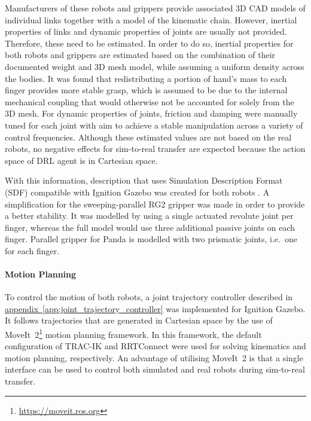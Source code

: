 Manufacturers of these robots and grippers provide associated 3D CAD models of individual links together with a model of the kinematic chain. However, inertial properties of links and dynamic properties of joints are usually not provided. Therefore, these need to be estimated. In order to do so, inertial properties for both robots and grippers are estimated based on the combination of their documented weight and 3D mesh model, while assuming a uniform density across the bodies. It was found that redistributing a portion of hand's mass to each finger provides more stable grasp, which is assumed to be due to the internal mechanical coupling that would otherwise not be accounted for solely from the 3D mesh. For dynamic properties of joints, friction and damping were manually tuned for each joint with aim to achieve a stable manipulation across a variety of control frequencies. Although these estimated values are not based on the real robots, no negative effects for sim-to-real transfer are expected because the action space of DRL agent is in Cartesian space.

With this information, description that uses Simulation Description Format (SDF) compatible with Ignition Gazebo was created for both robots \cite{orsula_manipulators_2021}. A simplification for the sweeping-parallel RG2 gripper was made in order to provide a better stability. It was modelled by using a single actuated revolute joint per finger, whereas the full model would use three additional passive joints on each finger. Parallel gripper for Panda is modelled with two prismatic joints, i.e.~one for each finger.

\paragraph{Motion Planning} To control the motion of both robots, a joint trajectory controller described in \hyperref[app:joint_trajectory_controller]{appendix~\ref*{app:joint_trajectory_controller}} was implemented for Ignition Gazebo. It follows trajectories that are generated in Cartesian space by the use of MoveIt~2\footnote{\href{https://moveit.ros.org}{https://moveit.ros.org}} motion planning framework. In this framework, the default configuration of TRAC-IK \cite{beeson_trac-ik_2015} and RRTConnect \cite{kuffner_rrt-connect_2000} were used for solving kinematics and motion planning, respectively. An advantage of utilising MoveIt~2 is that a single interface can be used to control both simulated and real robots during sim-to-real transfer.


